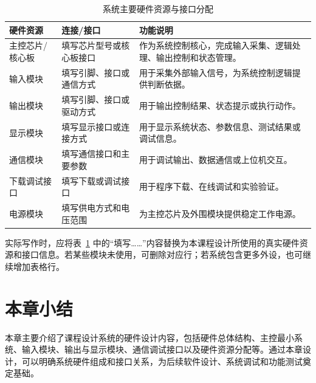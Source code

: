 \begin{table}[htbp]
    \centering
    \caption{系统主要硬件资源与接口分配}
    \label{tab:hardware_resources}
    \small
    \setlength{\tabcolsep}{4pt}
    \renewcommand{\arraystretch}{1.25}
    \begin{tabular}{|p{}|p{}|p{}|}
        \hline
        硬件资源 & 连接/接口 & 功能说明 \\
        \hline
        主控芯片/核心板 & 填写芯片型号或核心板接口 & 作为系统控制核心，完成输入采集、逻辑处理、输出控制和状态管理。 \\
        \hline
        输入模块 & 填写引脚、接口或通信方式 & 用于采集外部输入信号，为系统控制逻辑提供判断依据。 \\
        \hline
        输出模块 & 填写引脚、接口或驱动方式 & 用于输出控制结果、状态提示或执行动作。 \\
        \hline
        显示模块 & 填写显示接口或连接方式 & 用于显示系统状态、参数信息、测试结果或调试信息。 \\
        \hline
        通信模块 & 填写通信接口和主要参数 & 用于调试输出、数据通信或上位机交互。 \\
        \hline
        下载调试接口 & 填写下载或调试接口 & 用于程序下载、在线调试和实验验证。 \\
        \hline
        电源模块 & 填写供电方式和电压范围 & 为主控芯片及外围模块提供稳定工作电源。 \\
        \hline
    \end{tabular}
\end{table}

实际写作时，应将表~\ref{tab:hardware_resources} 中的“填写……”内容替换为本课程设计所使用的真实硬件资源和接口信息。若某些模块未使用，可删除对应行；若系统包含更多外设，也可继续增加表格行。

\section{本章小结}

本章主要介绍了课程设计系统的硬件设计内容，包括硬件总体结构、主控最小系统、输入模块、输出与显示模块、通信调试接口以及硬件资源分配等。通过本章设计，可以明确系统硬件组成和接口关系，为后续软件设计、系统调试和功能测试奠定基础。